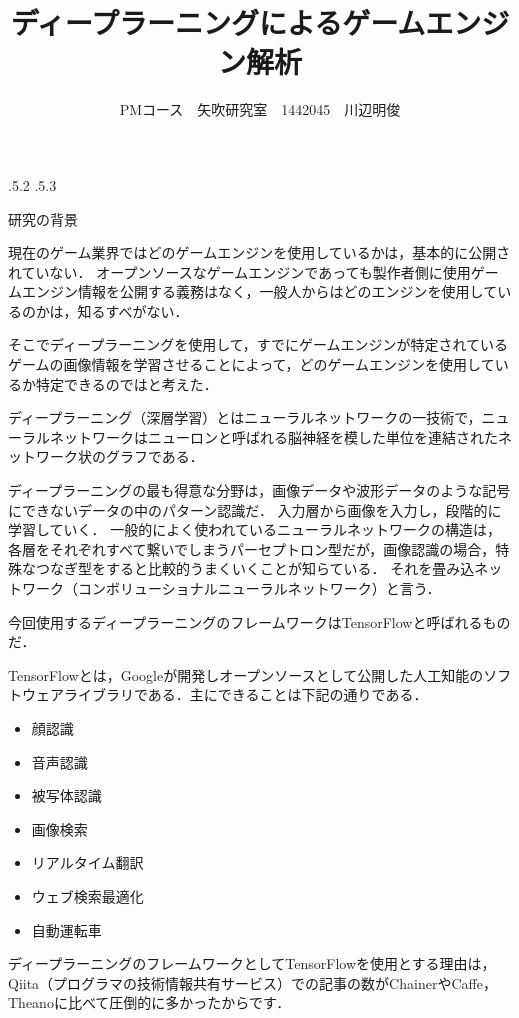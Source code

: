 \documentclass[uplatex]{jsarticle}
\title{\vspace{-14mm}ディープラーニングによるゲームエンジン解析}
\author{PMコース　矢吹研究室　1442045　川辺明俊}
\date{}%
\makeatletter
\renewcommand{\section}{%
    \if@slide\clearpage\fi
    \@startsection{section}{1}{\z@}%
    {\Cvs \@plus.5\Cdp \@minus.2\Cdp}%
    {.5\Cvs \@plus.3\Cdp}%
    {\normalfont\raggedright}}
\makeatother
\begin{document}
\maketitle

\section{研究の背景}

現在のゲーム業界ではどのゲームエンジンを使用しているかは，基本的に公開されていない．
オープンソースなゲームエンジンであっても製作者側に使用ゲームエンジン情報を公開する義務はなく，一般人からはどのエンジンを使用しているのかは，知るすべがない．

そこでディープラーニングを使用して，すでにゲームエンジンが特定されているゲームの画像情報を学習させることによって，どのゲームエンジンを使用しているか特定できるのではと考えた．

ディープラーニング（深層学習）とはニューラルネットワークの一技術で，ニューラルネットワークはニューロンと呼ばれる脳神経を模した単位を連結されたネットワーク状のグラフである．

ディープラーニングの最も得意な分野は，画像データや波形データのような記号にできないデータの中のパターン認識だ．
入力層から画像を入力し，段階的に学習していく．
一般的によく使われているニューラルネットワークの構造は，各層をそれぞれすべて繋いでしまうパーセプトロン型だが，画像認識の場合，特殊なつなぎ型をすると比較的うまくいくことが知らている．
それを畳み込ネットワーク（コンボリューショナルニューラルネットワーク）と言う\cite{abalab}．

今回使用するディープラーニングのフレームワークはTensorFlowと呼ばれるものだ．

TensorFlowとは，Googleが開発しオープンソースとして公開した人工知能のソフトウェアライブラリである\cite{wiki}．主にできることは下記の通りである．
\begin{itemize} 
\item 顔認識
\item 音声認識
\item 被写体認識
\item 画像検索
\item リアルタイム翻訳
\item ウェブ検索最適化
\item 自動運転車
\end{itemize}

ディープラーニングのフレームワークとしてTensorFlowを使用とする理由は，Qiita（プログラマの技術情報共有サービス）での記事の数がChainerやCaffe，Theanoに比べて圧倒的に多かったからです．
\end{document}
